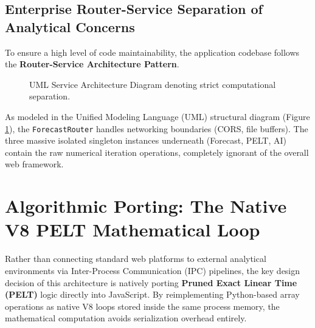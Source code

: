 \subsection{Enterprise Router-Service Separation of Analytical Concerns}
To ensure a high level of code maintainability, the application codebase follows the \textbf{Router-Service Architecture Pattern}.

\begin{figure}[H]
\centering
{}
\caption{UML Service Architecture Diagram denoting strict computational separation.}
\label{fig:uml_backend}
\end{figure}

As modeled in the Unified Modeling Language (UML) structural diagram (Figure \ref{fig:uml_backend}), the \texttt{ForecastRouter} handles networking boundaries (CORS, file buffers). The three massive isolated singleton instances underneath (Forecast, PELT, AI) contain the raw numerical iteration operations, completely ignorant of the overall web framework.

\section{Algorithmic Porting: The Native V8 PELT Mathematical Loop}
Rather than connecting standard web platforms to external analytical environments via Inter-Process Communication (IPC) pipelines, the key design decision of this architecture is natively porting \textbf{Pruned Exact Linear Time (PELT)} logic directly into JavaScript. By reimplementing Python-based array operations as native V8 loops stored inside the same process memory, the mathematical computation avoids serialization overhead entirely.

